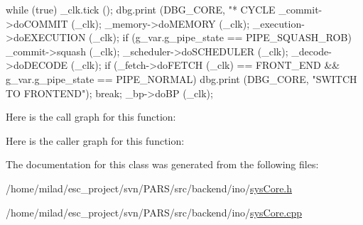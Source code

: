 \begin{DoxyCode}
                       {
        while (true) {
                _clk.tick ();
        dbg.print (DBG_CORE, "\n** CYCLE %
            _commit->doCOMMIT (_clk);
            _memory->doMEMORY (_clk);
            _execution->doEXECUTION (_clk);
        if (g_var.g_pipe_state == PIPE_SQUASH_ROB) _commit->squash (_clk);
            _scheduler->doSCHEDULER (_clk);
            _decode->doDECODE (_clk);
            if (_fetch->doFETCH (_clk) == FRONT_END && g_var.g_pipe_state == 
      PIPE_NORMAL) {
            dbg.print (DBG_CORE, "SWITCH TO FRONTEND\n");
            break;
        }
        _bp->doBP (_clk);
        }
}
\end{DoxyCode}


Here is the call graph for this function:




Here is the caller graph for this function:




The documentation for this class was generated from the following files:\begin{DoxyCompactItemize}
\item 
/home/milad/esc\_\-project/svn/PARS/src/backend/ino/\hyperlink{ino_2sysCore_8h}{sysCore.h}\item 
/home/milad/esc\_\-project/svn/PARS/src/backend/ino/\hyperlink{ino_2sysCore_8cpp}{sysCore.cpp}\end{DoxyCompactItemize}
